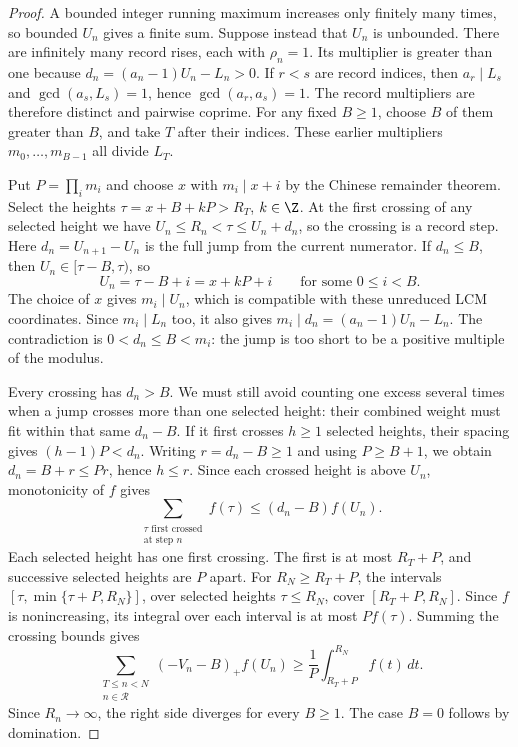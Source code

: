 \begin{proof}
A bounded integer running maximum increases only finitely many times, so
bounded $U_n$ gives a finite sum. Suppose instead that $U_n$ is unbounded.
There are infinitely many record rises, each with $\rho_n=1$. Its multiplier is
greater than one because $d_n=(a_n-1)U_n-L_n>0$. If $r<s$ are record
indices, then $a_r\mid L_s$ and $\gcd(a_s,L_s)=1$, hence
$\gcd(a_r,a_s)=1$. The record multipliers are therefore distinct and pairwise
coprime. For any fixed $B\ge1$, choose $B$ of them greater than $B$,
and take $T$ after their indices. These earlier multipliers
$m_0,\ldots,m_{B-1}$ all divide $L_T$.

Put $P=\prod_i m_i$ and choose $x$ with $m_i\mid x+i$ by the
Chinese remainder theorem. Select the heights $\tau=x+B+kP>R_T$,
$k\in\Z$. At the first crossing of any selected height we have
$U_n\le R_n<\tau\le U_n+d_n$, so the crossing is a record step.
Here $d_n=U_{n+1}-U_n$ is the full jump from the current numerator.
If $d_n\le B$, then $U_n\in[\tau-B,\tau)$, so
\[
 U_n=\tau-B+i=x+kP+i\qquad\text{for some }0\le i<B.
\]
The choice of $x$ gives $m_i\mid U_n$, which is compatible with these
unreduced LCM coordinates. Since $m_i\mid L_n$ too, it also gives
$m_i\mid d_n=(a_n-1)U_n-L_n$. The contradiction is
$0<d_n\le B<m_i$: the jump is too short to be a positive multiple
of the modulus.

Every crossing has $d_n>B$. We must still avoid counting one excess
several times when a jump crosses more than one selected height:
their combined weight must fit within that same $d_n-B$. If it first crosses $h\ge1$ selected heights,
their spacing gives $(h-1)P<d_n$.
Writing $r=d_n-B\ge1$ and using $P\ge B+1$, we obtain
$d_n=B+r\le Pr$, hence $h\le r$. Since each crossed height is above
$U_n$, monotonicity of $f$ gives
\[
 \sum_{\substack{\tau\text{ first crossed}\\\text{at step }n}}f(\tau)
 \le(d_n-B)f(U_n).
\]
Each selected height has one first crossing. The first is at most
$R_T+P$, and successive selected heights are $P$ apart. For
$R_N\ge R_T+P$, the intervals
$[\tau,\min\{\tau+P,R_N\}]$, over selected heights $\tau\le R_N$,
cover $[R_T+P,R_N]$. Since $f$ is nonincreasing, its integral over
each interval is at most $P f(\tau)$. Summing the crossing bounds gives
\begin{equation}\label{long243:eq:weightedcrossing}
 \sum_{\substack{T\le n<N\\n\in\mathcal R}}(-V_n-B)_+f(U_n)
 \ge\frac1P\int_{R_T+P}^{R_N} f(t)\,dt.
\end{equation}
Since $R_n\to\infty$, the right side diverges for every $B\ge1$.
The case $B=0$ follows by domination.
\end{proof}

